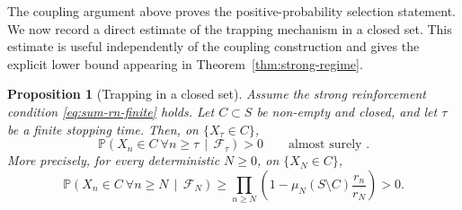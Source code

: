 \documentclass[10pt,letterpaper]{article}
\theoremstyle{compactplain}
\newtheorem{proposition}[theorem]{Proposition}
\theoremstyle{compactdefinition}
\newcommand{\1}{\mathds{1}}
\begin{document}
The coupling argument above proves the positive-probability selection statement.
We now record a direct estimate of the trapping mechanism in a closed set. This
estimate is useful independently of the coupling construction and gives the
explicit lower bound appearing in Theorem~\ref{thm:strong-regime}.

\begin{proposition}[Trapping in a closed set]
\label{prop:closed-trapping}
Assume the strong reinforcement condition \eqref{eq:sum-rn-finite} holds. Let
\(C\subset S\) be non-empty and closed, and let \(\tau\) be a finite stopping
time. Then, on \(\{X_\tau\in C\}\),
\[
\mathbb P\left(
X_n\in C\ \forall n\geq \tau
\,\middle|\,
\mathcal F_\tau
\right)>0
\qquad\text{almost surely }.
\]
More precisely, for every deterministic \(N\geq0\), on \(\{X_N\in C\}\),
\[
\mathbb P\left(
X_n\in C\ \forall n\geq N
\,\middle|\,
\mathcal F_N
\right)
\geq
\prod_{n\geq N}
\left(
1-\mu_N(S\setminus C)\frac{r_n}{r_N}
\right)>0.
\]
\end{proposition}
\end{document}
